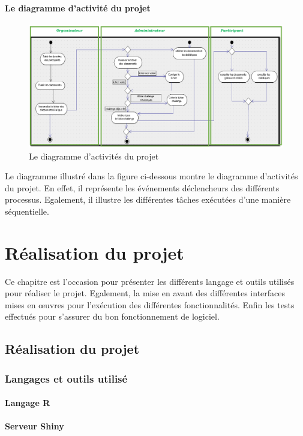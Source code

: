 \documentclass[12pt,a4paper]{report}
\begin{document}
\subsubsection{Le diagramme d'activité du projet}
\begin{figure}
	   \center
	   \includegraphics[scale=0.5]{Diagramme_activites.png}
	   \caption {Le diagramme d’activités du projet}
\end{figure}

Le diagramme illustré dans la figure ci-dessous montre le diagramme d’activités du projet. En effet, il représente les événements déclencheurs des différents processus. Egalement, il illustre les différentes tâches exécutées d’une manière séquentielle. 
\newpage
\chapter{Réalisation du projet}
Ce chapitre est l’occasion pour présenter les différents langage et outils utilisés pour réaliser le projet. Egalement, la mise en avant des différentes interfaces mises en œuvres pour l’exécution des différentes fonctionnalités. Enfin les tests effectués pour s’assurer du bon fonctionnement de logiciel.

\newpage
\section {Réalisation du projet }
\subsection {Langages et outils utilisé  }
\subsubsection {Langage R  }



\subsubsection {Serveur Shiny}
\end{document}
